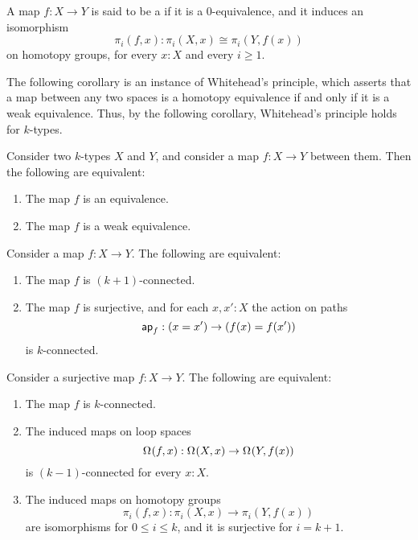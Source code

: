 \begin{defn}
  A map $f:X\to Y$ is said to be a  if it is a $0$-equivalence, and it induces an isomorphism
  \begin{equation*}
    \pi_i(f,x):\pi_i(X,x)\cong\pi_i(Y,f(x))
  \end{equation*}
  on homotopy groups, for every $x:X$ and every $i\geq 1$. 
\end{defn}

The following corollary is an instance of Whitehead's principle, which asserts that a map between any two spaces is a homotopy equivalence if and only if it is a weak equivalence. Thus, by the following corollary, Whitehead's principle holds for $k$-types.

\begin{cor}
  Consider two $k$-types $X$ and $Y$, and consider a map $f:X\to Y$ between them. Then the following are equivalent:
  \begin{enumerate}
  \item The map $f$ is an equivalence.
  \item The map $f$ is a weak equivalence.
  \end{enumerate}
\end{cor}

\begin{thm}
  Consider a map $f:X\to Y$. The following are equivalent:
  \begin{enumerate}
  \item The map $f$ is $(k+1)$-connected.
  \item The map $f$ is surjective, and for each $x,x':X$ the action on paths
    \begin{equation*}
      \mathsf{ap}_{f} : (x=x')\to (f(x)=f(x'))
    \end{equation*}
    is $k$-connected.
  \end{enumerate}
\end{thm}

\begin{thm}
  Consider a surjective map $f:X\to Y$. The following are equivalent:
  \begin{enumerate}
  \item The map $f$ is $k$-connected.
  \item The induced maps on loop spaces
    \begin{equation*}
      \Omega^{}(f,x):\Omega^{}(X,x)\to\Omega^{}(Y,f(x))
    \end{equation*}
    is $(k-1)$-connected for every $x:X$.
  \item The induced maps on homotopy groups
    \begin{equation*}
      \pi_i(f,x):\pi_i(X,x)\to\pi_i(Y,f(x))
    \end{equation*}
    are isomorphisms for $0\leq i\leq k$, and it is surjective for $i=k+1$. 
  \end{enumerate}
\end{thm}

